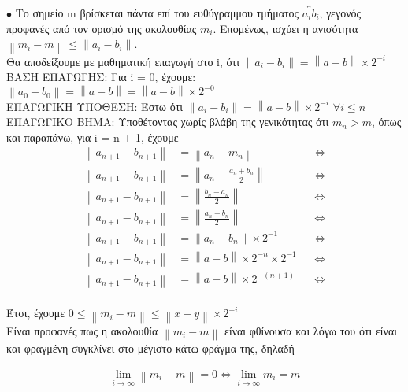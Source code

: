 \documentclass[12pt]{article}
\newcommand{\norm}[1]{\left\lVert#1\right\rVert}
\newcommand{\margin}{\hspace{4pt}}
\begin{document}
$\bullet$ Το σημείο m βρίσκεται πάντα επί του ευθύγραμμου τμήματος $\overleftrightarrow{a_{i}b_{i}}$,
γεγονός προφανές από τον ορισμό της ακολουθίας $m_i$.
Επομένως, ισχύει η ανισότητα $\norm{m_i - m} \leq \norm{a_i - b_i}$. \\

Θα αποδείξουμε με μαθηματική επαγωγή στο i, ότι $\norm{a_i - b_i} = \norm{a - b} \times 2^{-i}$\\

ΒΑΣΗ ΕΠΑΓΩΓΗΣ: Για i = 0, έχουμε: $\norm{a_0 - b_0} = \norm{a - b} = \norm{a - b} \times 2^{-0}$\\

ΕΠΑΓΩΓΙΚΗ ΥΠΟΘΕΣΗ: Έστω ότι $\norm{a_i - b_i} = \norm{a - b} \times 2^{-i} \margin \forall i \leq n$\\

ΕΠΑΓΩΓΙΚΟ ΒΗΜΑ: Υποθέτοντας χωρίς βλάβη της γενικότητας ότι $m_n > m$,
όπως και παραπάνω, για i = n + 1, έχουμε\\

\begin{align*}
    \norm{a_{n + 1} - b_{n + 1}} & = \norm{a_n - m_n} && \Leftrightarrow \\
    \norm{a_{n + 1} - b_{n + 1}} & = \norm{a_n - \frac{a_n + b_n}{2}} && \Leftrightarrow \\
    \norm{a_{n + 1} - b_{n + 1}} & = \norm{\frac{b_n - a_n}{2}} && \Leftrightarrow \\
    \norm{a_{n + 1} - b_{n + 1}} & = \norm{\frac{a_n - b_n}{2}} && \Leftrightarrow \\
    \norm{a_{n + 1} - b_{n + 1}} & = \norm{a_n - b_n} \times {2^{-1}} && \Leftrightarrow \\
    \norm{a_{n + 1} - b_{n + 1}} & = \norm{a - b} \times 2^{-n} \times {2^{-1}} && \Leftrightarrow \\
    \norm{a_{n + 1} - b_{n + 1}} & = \norm{a - b} \times 2^{-(n + 1)} && \Leftrightarrow
\end{align*}\\

Έτσι, έχουμε $0 \leq \norm{m_i - m} \leq \norm{x - y} \times 2^{-i}$\\

Είναι προφανές πως η ακολουθία $\norm{m_i - m}$ είναι φθίνουσα και λόγω του ότι είναι
και φραγμένη συγκλίνει στο μέγιστο κάτω φράγμα της, δηλαδή

\begin{align*}
    \lim_{i \to \infty} \norm{m_i - m} = 0 \Leftrightarrow \lim_{i \to \infty} m_i = m
\end{align*}
\end{document}
